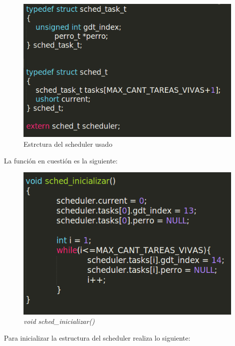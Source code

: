 \begin{figure}[H]
\begin{center}
 \includegraphics[width=\linewidth]{ejercicio7/sched.png}
 \caption{{\small Estrctura del scheduler usado} }
\endminipage
\end{center}
\end{figure}

La función en cuestión es la siguiente:

\begin{figure}[H]
\begin{center}
\includegraphics[width=\linewidth]{ejercicio7/funcion.png}
\caption{{\small \textit{void sched\_inicializar()} }}
\endminipage
\end{center}
\end{figure}

Para inicializar la estructura del scheduler realiza lo siguiente:

